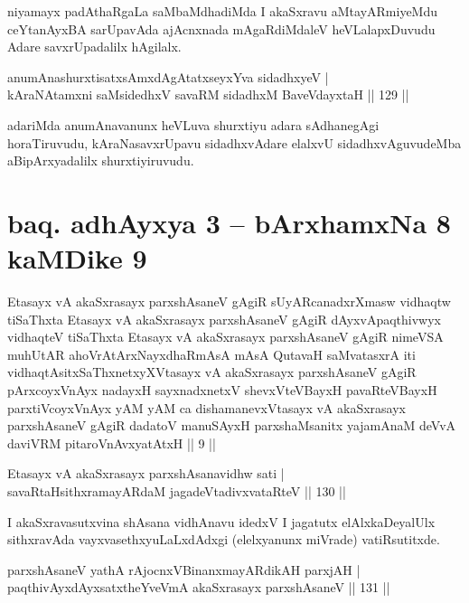 \begin{artha}%
niyamayx padAthaRgaLa saMbaMdhadiMda I akaSxravu aMtayARmiyeMdu ceYtanAyxBA sarUpavAda ajAcnxnada mAgaRdiMdaleV heVLalapxDuvudu Adare savxrUpadalilx hAgilalx.
\end{artha}

\begin{shl}
anumAnashurxtisatxsAmxdAgAtatxseyxYva sidadhxyeV |\\
kAraNAtamxni saMsidedhxV savaRM sidadhxM BaveVdayxtaH \hfill || 129 ||
\end{shl}

\begin{artha}
adariMda anumAnavanunx heVLuva shurxtiyu adara sAdhanegAgi horaTiruvudu, kAraNasavxrUpavu sidadhxvAdare elalxvU sidadhxvAguvudeMba aBipArxyadalilx shurxtiyiruvudu.
\end{artha}

\section*{baq. adhAyxya 3 -- bArxhamxNa 8 kaMDike 9}


\begin{shl}
Etasayx vA akaSxrasayx parxshAsaneV gAgiR sUyARcanadxrXmasw vidhaqtw tiSaThxta Etasayx vA akaSxrasayx parxshAsaneV gAgiR dAyxvApaqthivwyx vidhaqteV tiSaThxta Etasayx vA akaSxrasayx parxshAsaneV gAgiR nimeVSA muhUtAR ahoVrAtArxNayxdhaRmAsA mAsA QutavaH saMvatasxrA iti vidhaqtAsitxSaThxnetxyXVtasayx vA akaSxrasayx parxshAsaneV gAgiR pArxcoyxV\s nAyx nadayxH sayxnadxnetxV shevxVteVBayxH pavaRteVBayxH parxtiVcoyxV\s nAyx yAM yAM ca dishamanevxVtasayx vA akaSxrasayx parxshAsaneV gAgiR dadatoV manuSAyxH parxshaMsanitx yajamAnaM deVvA daviVRM pitaroV\s nAvxyatAtxH || 9 ||
\end{shl}

\begin{shl}
Etasayx vA akaSxrasayx parxshAsanavidhw sati |\\
savaRtaHsithxramayARdaM jagadeVtadivxvataRteV \hfill || 130 ||
\end{shl}

\begin{artha}%
I akaSxravasutxvina shAsana vidhAnavu idedxV I jagatutx elAlxkaDeyalUlx sithxravAda vayxvasethxyuLaLxdAdxgi (elelxyanunx miVrade) vatiRsutitxde.
\end{artha}

\begin{shl}
parxshAsaneV yathA rAjocnxV\s BinanxmayARdikAH parxjAH |\\
paqthivAyxdAyxsatxtheYveVmA akaSxrasayx parxshAsaneV \hfill || 131 ||
\end{shl}

